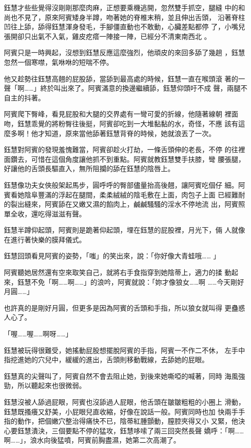 鈺慧才些些覺得沒剛剛那麼肉麻，正想要乘機逃開，忽然雙手抓空，腿縫
中的和尚也不見了，原來阿賓矮身半蹲，吻著她的脊椎末稍，並且伸出舌頭，
沿著脊柱凹往上舔，舔得鈺慧渾身發毛，手腳僵直動也不敢動，心臟差點都停
了，小嘴兒張開卻只出氣不入氣，雞皮疙瘩一陣接一陣，已經分不清東南西北
。

阿賓只是一時興起，沒想到鈺慧反應這麼強烈，他頑皮的來回多舔了幾趟
，鈺慧忽然一個寒噤，氣咻咻的短喘不停。

他又趁勢往鈺慧高翹的屁股舔，當舔到最高處的時候，鈺慧一直在喉頭滾
著的一聲「啊……」終於叫出來了。阿賓滿意的換邊繼續舔，鈺慧仰頭吁不成
聲，兩腿不自主的抖著。

阿賓爬下臀峰，看見屁股和大腿的交界處有一彎可愛的折線，他隨著線朝
裡面吻，鈺慧乖覺的將粉臀往後挺，阿賓卻吃到一大堆黏黏的水，奇怪，不應
該有這麼多啊！他才知道，原來當他舔著鈺慧背脊的時候，她就浪丟了一次。

鈺慧對阿賓的發現羞愧難當，阿賓卻趁火打劫，一條舌頭伸的老長，不停
的往裡面鑽去，可惜在這個角度讓他抓不到重點。阿賓就教鈺慧雙手扶膝，彎
腰張腿，好讓他的舌頭長驅直入，無所阻攔的舔在鈺慧的陰唇上。

鈺慧像功夫女俠般架起馬步，圓呼呼的臀部儘量抬高後翹，讓阿賓吃個仔
細。阿賓看她陰阜豐滿的浮起在腿間，柔柔絨絨的陰毛敷在上面，肉包子上面
已經難耐的裂出縫來，阿賓舔在又嫩又濕的餡肉上，鹹鹹騷騷的淫水不停地流
出，阿賓照單全收，還吃得滋滋有聲。

鈺慧半蹲仰起頭，阿賓則是跪著仰起頭，埋在鈺慧的屁股裡，月光下，倆
人就像在進行著快樂的膜拜儀式。

鈺慧回頭看見阿賓的姿勢，「嗤」的笑出來，說：「你好像大青蛙哦……
」

阿賓聽她居然還有空來取笑自己，就將右手食指穿到她陰蒂上，適力的揉
動起來，鈺慧不免「啊……啊……」的浪吟，阿賓就說：「妳才像狼女……啊
……今天剛好月圓……」

也許真的是剛好月圓，但更多是因為阿賓的舌頭和手指，所以狼女就叫得
更蠱惑人心了。

「喔……喔……啊呀……」

鈺慧被玩得很難受，她搖動屁股想擺脫阿賓的手指，阿賓一不作二不休，
左手中指挖進她的穴兒中，緩緩的進出，舌頭則移動戰線，去舔她的屁眼。

鈺慧真的尖聲叫了，阿賓自然不會去阻止她，到後來她嘶啞的喊著，同時
海風強勁，所以聽起來也很微弱。

鈺慧沒被人舔過屁眼，阿賓也沒舔過人屁眼，他舌頭在皺皺粗粗的小圈上
滑動，鈺慧既搔癢又舒美，小屁眼兒直收縮，好像在說話一般。阿賓同時也加
快兩手手指的動作，把個嫩穴整治得痛快不已，陰蒂紅腫顫動，膣腔夾得又小
又緊，他決心要鈺慧潰決，三個要點不停的猛攻，鈺慧哆嗦了兩三回突然長聲
嬌呼：「啊……啊……」，浪水向後猛噴，阿賓前胸盡濕，她第二次高潮了。

